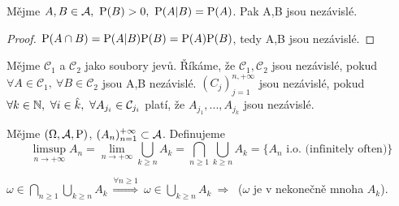 \begin{theorem}
	Mějme $A,B \in \mathcal{A} ,~\mathrm{P}(B)>0,~\mathrm{P}(A|B)=\mathrm{P}(A)$. Pak A,B jsou nezávislé.
	\begin{proof}
		$\mathrm{P}(A\cap B)=\mathrm{P}(A|B)\mathrm{P}(B)=\mathrm{P}(A)\mathrm{P}(B)$, tedy A,B jsou nezávislé.
	\end{proof}
\end{theorem}
\begin{define} 
	Mějme $\mathcal{C}_1$ a $\mathcal{C}_2$ jako soubory jevů. Říkáme, že $\mathcal{C}_1,\mathcal{C}_2$ jsou nezávislé, pokud \newline $\forall A \in \mathcal{C}_1,~\forall B \in \mathcal{C}_2 $ jsou A,B nezávislé. $(C_j)_{j=1}^{n,+\infty}$ jsou nezávislé, pokud $\forall k\in\mathbb{N},~\forall i \in \hat{k},~ \forall A_{j_i} \in \mathcal{C}_{j_i}$  platí, že $A_{j_1},...,A_{j_k}$ jsou nezávislé.
\end{define}
\begin{define}
	Mějme $(\Omega,\mathcal{A},\mathrm{P})$, $(A_n)_{n=1}^{+\infty} \subset \mathcal{A} $. Definujeme $$\limsup\limits_{n \to +\infty} A_n = \lim\limits_{n \to +\infty} \bigcup\limits_{k\geq n} A_k=\bigcap\limits_{n \geq 1} \bigcup\limits_{k \geq n} A_k = \{A_n\text{ i.o. (infinitely often)}\}$$
\end{define}
\begin{remark}
 $\omega \in \bigcap\limits_{n \geq 1} \bigcup\limits_{k \geq n} A_k ~\stackrel{\forall n \geq 1}{\Longrightarrow}~ \omega \in \bigcup\limits_{k \geq n} A_k ~\Rightarrow~$ ($\omega$ je v nekonečně mnoha $A_k$).
\end{remark}
\newpage
